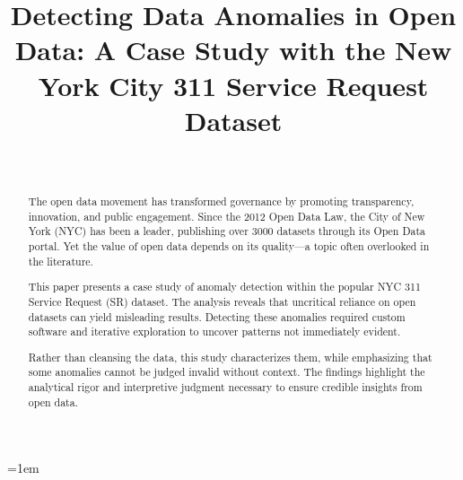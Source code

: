 \documentclass[linenumber]{jdsart}
\begin{document}



\begin{frontmatter}
  
\title{Detecting Data Anomalies in Open Data: A Case Study with the New
York City 311 Service Request Dataset}

\author[1]{~}
\address[1]{, }

\begin{abstract}
The open data movement has transformed governance by promoting transparency,
innovation, and public engagement. Since the 2012 Open Data Law, the City of
New York (NYC) has been a leader, publishing over  
\num[round-precision=0]{3000}
datasets through its Open Data portal. Yet the value 
of open data depends on its quality—a topic often overlooked in the literature.

This paper presents a case study of anomaly detection within the popular NYC
311 Service Request (SR) dataset. The analysis reveals that
uncritical reliance on open datasets can yield misleading results.
Detecting these anomalies required custom software and iterative
exploration to uncover patterns not immediately evident.

Rather than cleansing the data, this study characterizes them, while emphasizing
that some anomalies cannot be judged invalid without context. The findings 
highlight the analytical rigor and interpretive judgment necessary to ensure
credible insights from open data.
\end{abstract}

\begin{keywords}
\end{keywords}

\end{frontmatter}

\emergencystretch=1em

\end{document}
